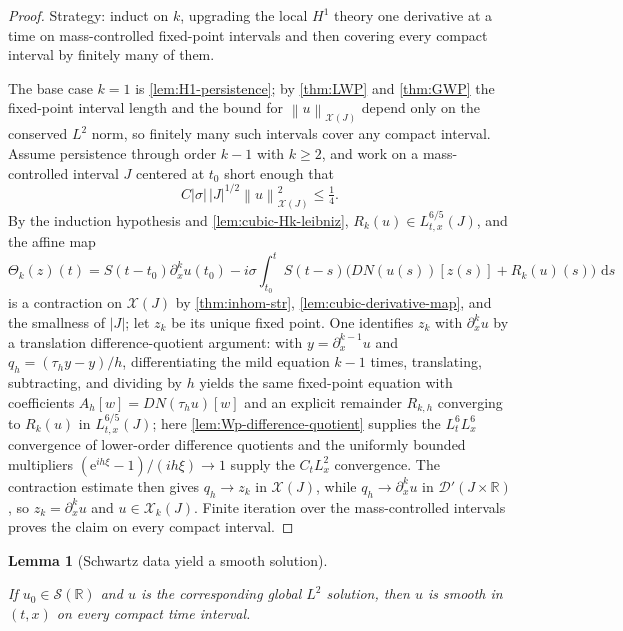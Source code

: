 \documentclass[11pt,oneside]{book}
\providecommand{\uses}[1]{}
\newtheorem{lemma}[theorem]{Lemma}
\theoremstyle{definition}
\theoremstyle{remark}
\newcommand{\R}{\mathbb R}
\newcommand{\Ssch}{\mathcal S}
\newcommand{\1}{\mathbf 1}
\newcommand{\dd}{\,\mathrm d}
\newcommand{\norm}[1]{\left\lVert #1\right\rVert}
\newcommand{\e}{\mathrm e}
\begin{document}
\begin{proof}
\uses{lem:H1-persistence, thm:LWP, thm:inhom-str, lem:cubic-Hk-leibniz, lem:cubic-derivative-map, lem:Wp-difference-quotient, thm:GWP}
Strategy: induct on $k$, upgrading the local $H^1$ theory one derivative at a
time on mass-controlled fixed-point intervals and then covering every compact
interval by finitely many of them.

The base case $k=1$ is \cref{lem:H1-persistence}; by \cref{thm:LWP} and
\cref{thm:GWP} the fixed-point interval length and the bound for
$\norm u_{\mathcal X(J)}$ depend only on the conserved $L^2$ norm, so finitely
many such intervals cover any compact interval.  Assume persistence through
order $k-1$ with $k\ge2$, and work on a mass-controlled interval $J$ centered
at $t_0$ short enough that
\[
 C|\sigma|\,|J|^{1/2}\norm u_{\mathcal X(J)}^2\le\tfrac14.
\]
By the induction hypothesis and \cref{lem:cubic-Hk-leibniz},
$R_k(u)\in L^{6/5}_{t,x}(J)$, and the affine map
\[
 \Theta_k(z)(t)=S(t-t_0)\partial_x^ku(t_0)
 -i\sigma\int_{t_0}^tS(t-s)\bigl(DN(u(s))[z(s)]+R_k(u)(s)\bigr)\,\dd s
\]
is a contraction on $\mathcal X(J)$ by \cref{thm:inhom-str},
\cref{lem:cubic-derivative-map}, and the smallness of $|J|$; let $z_k$ be its
unique fixed point.  One identifies $z_k$ with $\partial_x^ku$ by a
translation difference-quotient argument: with $y=\partial_x^{k-1}u$ and
$q_h=(\tau_hy-y)/h$, differentiating the mild equation $k-1$ times,
translating, subtracting, and dividing by $h$ yields the same fixed-point
equation with coefficients $A_h[w]=DN(\tau_hu)[w]$ and an explicit remainder
$R_{k,h}$ converging to $R_k(u)$ in $L^{6/5}_{t,x}(J)$; here
\cref{lem:Wp-difference-quotient} supplies the $L^6_tL^6_x$ convergence of
lower-order difference quotients and the uniformly bounded multipliers
$(\e^{ih\xi}-1)/(ih\xi)\to1$ supply the $C_tL^2_x$ convergence.  The
contraction estimate then gives $q_h\to z_k$ in $\mathcal X(J)$, while
$q_h\to\partial_x^ku$ in $\mathcal{D}'(J\times\R)$, so $z_k=\partial_x^ku$ and
$u\in\mathcal X_k(J)$.  Finite iteration over the mass-controlled intervals
proves the claim on every compact interval.
\end{proof}

\begin{lemma}[Schwartz data yield a smooth solution]
\label{lem:schwartz-smooth}
\uses{prop:Hk-persistence}
If $u_0\in\Ssch(\R)$ and $u$ is the corresponding global $L^2$ solution, then
$u$ is smooth in $(t,x)$ on every compact time interval.
\end{lemma}
\end{document}
